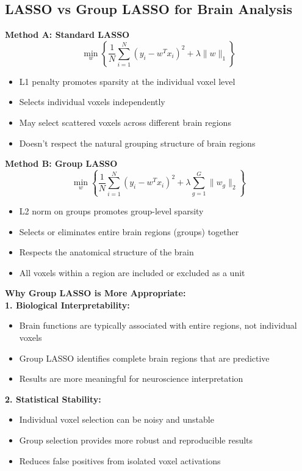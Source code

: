 \documentclass[12pt]{article}
\begin{document}
\subsection{LASSO vs Group LASSO for Brain Analysis}

\textbf{Method A: Standard LASSO}
$$\min_{w} \left\{\frac{1}{N}\sum_{i=1}^{N}(y_i - w^T x_i)^2 + \lambda\|w\|_1\right\}$$

\begin{itemize}
    \item L1 penalty promotes sparsity at the individual voxel level
    \item Selects individual voxels independently
    \item May select scattered voxels across different brain regions
    \item Doesn't respect the natural grouping structure of brain regions
\end{itemize}

\textbf{Method B: Group LASSO}
$$\min_{w} \left\{\frac{1}{N}\sum_{i=1}^{N}(y_i - w^T x_i)^2 + \lambda\sum_{g=1}^{G}\|w_g\|_2\right\}$$

\begin{itemize}
    \item L2 norm on groups promotes group-level sparsity
    \item Selects or eliminates entire brain regions (groups) together
    \item Respects the anatomical structure of the brain
    \item All voxels within a region are included or excluded as a unit
\end{itemize}

\textbf{Why Group LASSO is More Appropriate:}\\

\textbf{1. Biological Interpretability:}
\begin{itemize}
    \item Brain functions are typically associated with entire regions, not individual voxels
    \item Group LASSO identifies complete brain regions that are predictive
    \item Results are more meaningful for neuroscience interpretation
\end{itemize}

\textbf{2. Statistical Stability:}
\begin{itemize}
    \item Individual voxel selection can be noisy and unstable
    \item Group selection provides more robust and reproducible results
    \item Reduces false positives from isolated voxel activations
\end{itemize}
\end{document}
